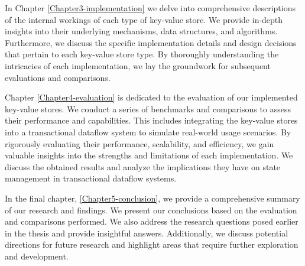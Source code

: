 In Chapter \ref{Chapter3-implementation} we delve into comprehensive descriptions of the internal workings of each type of key-value store. We provide in-depth insights into their underlying mechanisms, data structures, and algorithms. Furthermore, we discuss the specific implementation details and design decisions that pertain to each key-value store type. By thoroughly understanding the intricacies of each implementation, we lay the groundwork for subsequent evaluations and comparisons.

Chapter \ref{Chapter4-evaluation} is dedicated to the evaluation of our implemented key-value stores. We conduct a series of benchmarks and comparisons to assess their performance and capabilities. This includes integrating the key-value stores into a transactional dataflow system to simulate real-world usage scenarios. By rigorously evaluating their performance, scalability, and efficiency, we gain valuable insights into the strengths and limitations of each implementation. We discuss the obtained results and analyze the implications they have on state management in transactional dataflow systems.

In the final chapter, \ref{Chapter5-conclusion}, we provide a comprehensive summary of our research and findings. We present our conclusions based on the evaluation and comparisons performed. We also address the research questions posed earlier in the thesis and provide insightful answers. Additionally, we discuss potential directions for future research and highlight areas that require further exploration and development.
